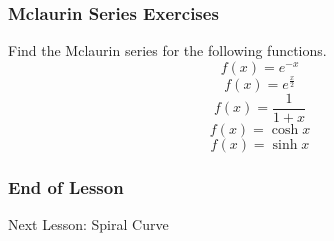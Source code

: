 \documentclass[xcolor=dvipsnames]{beamer}
\begin{document}
\begin{frame}
  \frametitle{Mclaurin Series Exercises}
  Find the Mclaurin series for the following functions.
  \begin{equation}
    \label{eq:oxishait}
    f(x)=e^{-x}
  \end{equation}
  \begin{equation}
    \label{eq:chuyeeye}
    f(x)=e^{\frac{x}{2}}
  \end{equation}
  \begin{equation}
    \label{eq:queiyuif}
    f(x)=\frac{1}{1+x}
  \end{equation}
  \begin{equation}
    \label{eq:aoyahphe}
    f(x)=\cosh{}x
  \end{equation}
  \begin{equation}
    \label{eq:ahtoilei}
    f(x)=\sinh{}x
  \end{equation}
\end{frame}

\begin{frame}
  \frametitle{End of Lesson}
Next Lesson: Spiral Curve
\end{frame}
\end{document}
